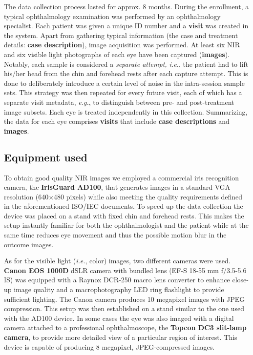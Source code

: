 \documentclass[conference]{IEEEtran}
\begin{document}
The data collection process lasted for approx. 8 months. During the enrollment, a typical ophthalmology examination was performed by an ophthalmology specialist. Each patient was given a unique ID number and a \textbf{visit} was created in the system. Apart from gathering typical information (the case and treatment details: \textbf{case description}), image acquisition was performed. At least six NIR and six visible light photographs of each eye have been captured (\textbf{images}). Notably, each sample is considered a \emph{separate attempt, i.e.}, the patient had to lift his/her head from the chin and forehead rests after each capture attempt. This is done to deliberately introduce a certain level of noise in the intra-session sample sets. This strategy was then repeated for every future visit, each of which has a separate visit metadata, \emph{e.g.}, to distinguish between pre- and post-treatment image subsets. Each eye is treated independently in this collection. Summarizing, the data for each eye comprises \textbf{visits} that include \textbf{case descriptions} and \textbf{images}.

\subsection{Equipment used}
To obtain good quality NIR images we employed a commercial iris recognition camera, the \textbf{IrisGuard AD100}, that generates images in a standard VGA resolution (640$\times$480 pixels) while also meeting the quality requirements defined in the aforementioned ISO/IEC documents. To speed up the data collection the device was placed on a stand with fixed chin and forehead rests. This makes the setup instantly familiar for both the ophthalmologist and the patient while at the same time reduces eye movement and thus the possible motion blur in the outcome images.

As for the visible light (\emph{i.e.}, color) images, two different cameras were used. \textbf{Canon EOS 1000D} dSLR camera with bundled lens (EF-S 18-55 mm f/3.5-5.6 IS) was equipped with a Raynox DCR-250 macro lens converter to enhance close-up image quality and a macrophotography LED ring flashlight to provide sufficient lighting. The Canon camera produces 10 megapixel images with JPEG compression. This setup was then established on a stand similar to the one used with the AD100 device. In some cases the eye was also imaged with a digital camera attached to a professional ophthalmoscope, the \textbf{Topcon DC3 slit-lamp camera}, to provide more detailed view of a particular region of interest. This device is capable of producing 8 megapixel, JPEG-compressed images.
\end{document}
